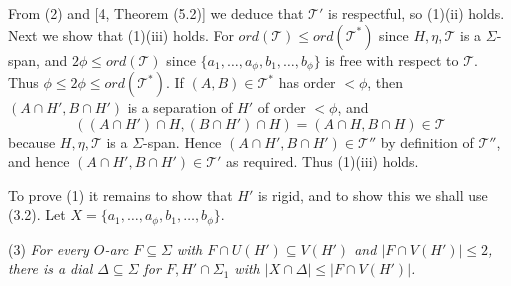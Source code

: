 From (2) and [4, Theorem (5.2)] we deduce that $\mathscr{T}'$ is respectful, so (1)(ii) holds. Next we show that (1)(iii) holds. For $ord(\mathscr{T}) \le ord(\mathscr{T}^*)$ since $H, \eta, \mathscr{T}$ is a $\Sigma$-span, and $2\phi \le ord(\mathscr{T})$ since $\{a_1, \dots, a_\phi, b_1, \dots, b_\phi\}$ is free with respect to $\mathscr{T}$. Thus $\phi \le 2\phi \le ord(\mathscr{T}^*)$. If $(A, B) \in \mathscr{T}^*$ has order $< \phi$, then $(A \cap H', B \cap H')$ is a separation of $H'$ of order $< \phi$, and
\begin{equation*}
((A \cap H') \cap H, (B \cap H') \cap H) = (A \cap H, B \cap H) \in \mathscr{T}
\end{equation*}
because $H, \eta, \mathscr{T}$ is a $\Sigma$-span. Hence $(A \cap H', B \cap H') \in \mathscr{T}''$ by definition of $\mathscr{T}''$, and hence $(A \cap H', B \cap H') \in \mathscr{T}'$ as required. Thus (1)(iii) holds.

To prove (1) it remains to show that $H'$ is rigid, and to show this we shall use (3.2). Let $X = \{a_1, \dots, a_\phi, b_1, \dots, b_\phi\}$.

\hspace*{12pt}(3) \textit{For every $O$-arc $F \subseteq \Sigma$ with $F \cap U(H') \subseteq V(H')$ and $|F \cap V(H')| \le 2$, there is a dial $\Delta \subseteq \Sigma$ for $F, H' \cap \Sigma_1$ with $|X \cap \Delta| \le |F \cap V(H')|$.}
